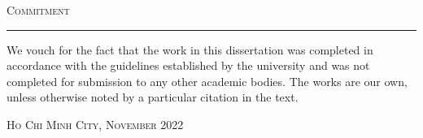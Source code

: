\thispagestyle{empty}
\vspace*{3cm}
\noindent\Huge\textsc{Commitment}\\
\normalsize
\noindent\rule[2pt]{\textwidth}{0.8pt}
\hspace*{5cm}

We vouch for the fact that the work in this dissertation was completed in accordance with the guidelines established by the university and was not completed for submission to any other academic bodies. The works are our own, unless otherwise noted by a particular citation in the text.
	
\hfill \textsc{Ho Chi Minh City, November 2022}
	
\cleardoublepage
